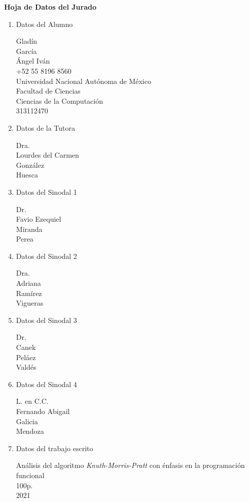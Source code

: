 

\begin{center}
{\Large \textbf{Hoja de Datos del Jurado}}
\vspace*{.85cm}
\end{center}


\begin{enumerate}

\item Datos del Alumno

Gladín \\
García \\
Ángel Iván \\
+52 55 8196 8560 \\
Universidad Nacional Autónoma de México \\
Facultad de Ciencias \\
Ciencias de la Computación \\
313112470


\item Datos de la Tutora

Dra. \\
Lourdes del Carmen \\
González \\
Huesca


\item Datos del Sinodal 1

Dr. \\
Favio Ezequiel \\
Miranda \\
Perea


\item Datos del Sinodal 2

Dra. \\
Adriana \\
Ramírez \\
Vigueras


\item Datos del Sinodal 3

Dr. \\
Canek \\
Peláez \\
Valdés


\item Datos del Sinodal 4

L. en C.C. \\
Fernando Abigail \\
Galicia \\
Mendoza


\item Datos del trabajo escrito

{\small Análisis del algoritmo \textit{Knuth-Morris-Pratt} con énfasis en la programación funcional} \\
100p. \\ %
2021 


\end{enumerate} 
